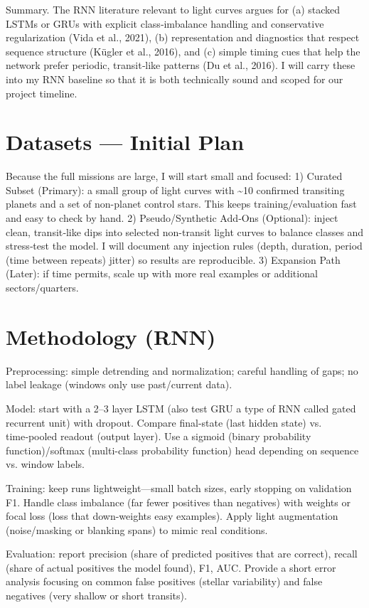\documentclass[letterpaper]{article}
\begin{document}
Summary. The RNN literature relevant to light curves argues for (a) stacked LSTMs or GRUs with explicit class‑imbalance handling and conservative regularization (Vida et al., 2021), (b) representation and diagnostics that respect sequence structure (Kügler et al., 2016), and (c) simple timing cues that help the network prefer periodic, transit‑like patterns (Du et al., 2016). I will carry these into my RNN baseline so that it is both technically sound and scoped for our project timeline.


\section*{Datasets — Initial Plan}
Because the full missions are large, I will start small and focused:
1) Curated Subset (Primary): a small group of light curves with \textasciitilde{}10 confirmed transiting planets and a set of non-planet control stars. This keeps training/evaluation fast and easy to check by hand.
2) Pseudo/Synthetic Add‑Ons (Optional): inject clean, transit‑like dips into selected non-transit light curves to balance classes and stress‑test the model. I will document any injection rules (depth, duration, period (time between repeats) jitter) so results are reproducible.
3) Expansion Path (Later): if time permits, scale up with more real examples or additional sectors/quarters.


\section*{Methodology (RNN)}
Preprocessing: simple detrending and normalization; careful handling of gaps; no label leakage (windows only use past/current data).

Model: start with a 2–3 layer LSTM (also test GRU a type of RNN called gated recurrent unit) with dropout. Compare final-state (last hidden state) vs. time‑pooled readout (output layer). Use a sigmoid (binary probability function)/softmax (multi-class probability function) head depending on sequence vs. window labels.

Training: keep runs lightweight—small batch sizes, early stopping on validation F1. Handle class imbalance (far fewer positives than negatives) with weights or focal loss (loss that down-weights easy examples). Apply light augmentation (noise/masking or blanking spans) to mimic real conditions.

Evaluation: report precision (share of predicted positives that are correct), recall (share of actual positives the model found), F1, AUC. Provide a short error analysis focusing on common false positives (stellar variability) and false negatives (very shallow or short transits).
\end{document}
